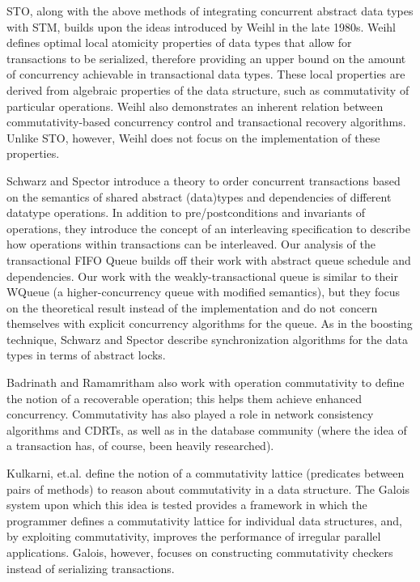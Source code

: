 STO, along with the above methods of integrating concurrent abstract data types with STM, builds upon the ideas introduced by Weihl in the late 1980s\cite{weihl}. Weihl defines optimal local atomicity properties of data types that allow for transactions to be serialized, therefore providing an upper bound on the amount of concurrency achievable in transactional data types. These local properties are derived from algebraic properties of the data structure, such as commutativity of particular operations. Weihl also demonstrates an inherent relation between commutativity-based concurrency control and transactional recovery algorithms. Unlike STO, however, Weihl does not focus on the implementation of these properties.

Schwarz and Spector\cite{schwarz} introduce a theory to order concurrent transactions based on the semantics of shared abstract (data)types and dependencies of different datatype operations. In addition to pre/postconditions and invariants of operations, they introduce the concept of an interleaving specification to describe how operations within transactions can be interleaved. Our analysis of the transactional FIFO Queue builds off their work with abstract queue schedule and dependencies. Our work with the weakly-transactional queue is similar to their WQueue (a higher-concurrency queue with modified semantics), but they focus on the theoretical result instead of the implementation and do not concern themselves with explicit concurrency algorithms for the queue. As in the boosting technique, Schwarz and Spector describe synchronization algorithms for the data types in terms of abstract locks.

Badrinath and Ramamritham\cite{badrinath} also work with operation commutativity to define the notion of a recoverable operation; this helps them achieve enhanced concurrency. Commutativity has also played a role in network consistency algorithms and CDRTs\cite{CRDT}, as well as in the database community (where the idea of a transaction has, of course, been heavily researched).

Kulkarni, et.al.\cite{galois} define the notion of a commutativity lattice (predicates between pairs of methods) to reason about commutativity in a data structure. The Galois system upon which this idea is tested provides a framework in which the programmer defines a commutativity lattice for individual data structures, and, by exploiting commutativity, improves the performance of irregular parallel applications. Galois, however, focuses on constructing commutativity checkers instead of serializing transactions.
